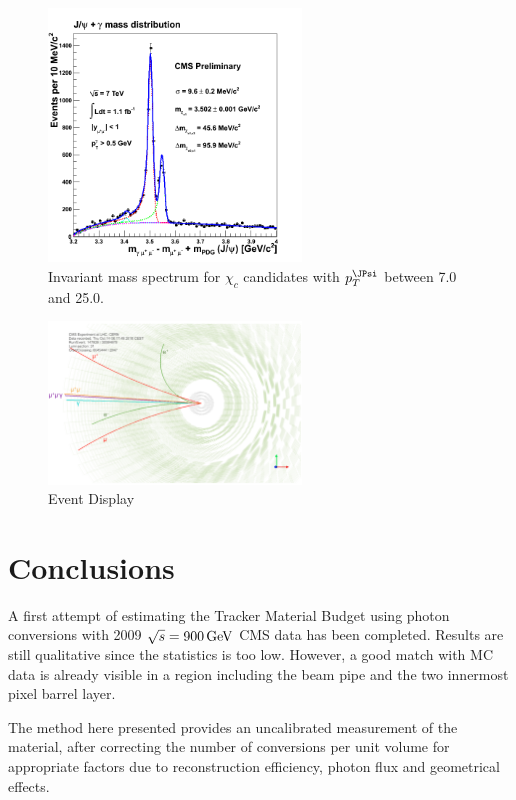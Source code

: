 \documentclass[a4paper]{jpconf}
\begin{document}
\begin{figure}[t]
    \centering
    \includegraphics[width=0.6\textwidth]{fig/Chic1fb.png}
    \caption{Invariant mass spectrum for $\chi_c$ candidates with $p_T^{\JPsi}$ between 7.0 and 25.0\GeVc.}
    \label{fig:chic}
\end{figure} 


\begin{figure}[t]
    \centering
    \includegraphics[width=0.6\textwidth]{fig/EvtDisplay.png}
    \caption{Event Display}
    \label{fig:evtdisplay}
\end{figure} 

\section{Conclusions}
\label{section_conclusions}

A first attempt of estimating the Tracker Material Budget using photon conversions with 2009 $\sqrt{s}=900{\rm \, GeV}$ CMS 
data has been completed.
Results are still qualitative since the statistics is too low. 
However, a good match with MC data is already visible in a region including the beam pipe and the two innermost pixel barrel layer.

The method here presented provides an uncalibrated measurement of the material, after correcting the number of conversions per unit volume 
for appropriate factors due to reconstruction efficiency, photon flux and geometrical effects. 
\end{document}
